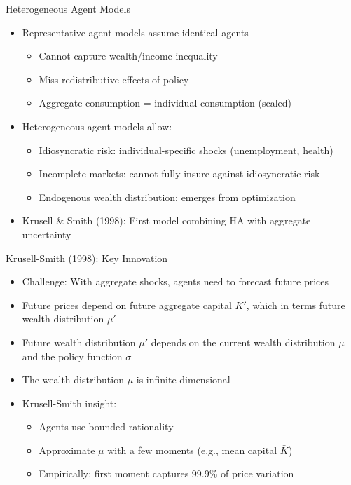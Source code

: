 \documentclass[aspectratio=169]{beamer}
\newcommand{\1}{\mathbf{1}}
\begin{document}

\begin{frame}{Heterogeneous Agent Models}
  \begin{itemize}
      \item Representative agent models assume identical agents
      \begin{itemize}
          \item Cannot capture wealth/income inequality
          \item Miss redistributive effects of policy
          \item Aggregate consumption = individual consumption (scaled)
      \end{itemize}
      \item Heterogeneous agent models allow:
      \begin{itemize}
          \item Idiosyncratic risk: individual-specific shocks (unemployment, health)
          \item Incomplete markets: cannot fully insure against idiosyncratic risk
          \item Endogenous wealth distribution: emerges from optimization
      \end{itemize}
      \item Krusell \& Smith (1998): First model combining HA with aggregate uncertainty
  \end{itemize}
\end{frame}

\begin{frame}{Krusell-Smith (1998): Key Innovation}
  \begin{itemize}
      \item Challenge: With aggregate shocks, agents need to forecast future prices
      \item Future prices depend on future aggregate capital $K'$, which in terms future wealth distribution $\mu'$
      \item Future wealth distribution $\mu'$ depends on the current wealth distribution $\mu$ and the policy function $\sigma$
      \item The wealth distribution $\mu$ is infinite-dimensional
      \vspace{0.5em}
      \item Krusell-Smith insight: 
      \begin{itemize}
          \item Agents use bounded rationality
          \item Approximate $\mu$ with a few moments (e.g., mean capital $\bar{K}$)
          \item Empirically: first moment captures 99.9\% of price variation
      \end{itemize}
  \end{itemize}
\end{frame}
\end{document}

